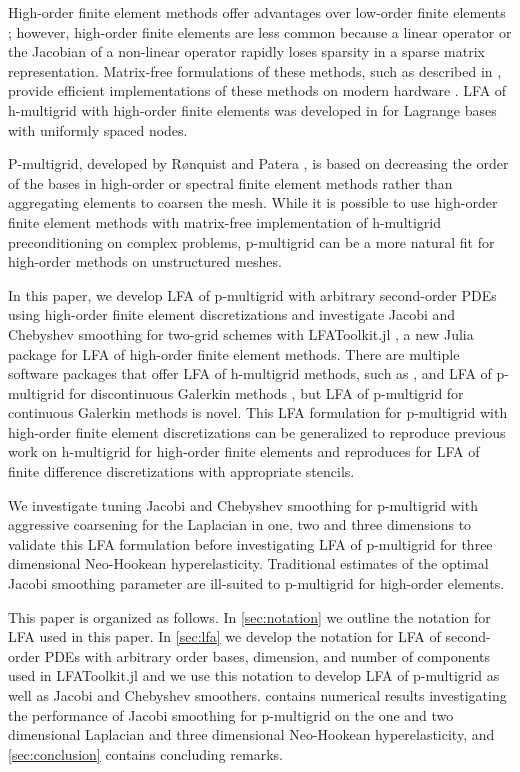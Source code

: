 \documentclass[review]{siamart190516}
\begin{document}
High-order finite element methods offer advantages over low-order finite elements \cite{demkowicz1989toward, oden1989toward, rachowicz1989toward}; however, high-order finite elements are less common because a linear operator or the Jacobian of a non-linear operator rapidly loses sparsity in a sparse matrix representation.
Matrix-free formulations of these methods, such as described in \cite{brown2010efficient, knoll2004jacobian}, provide efficient implementations of these methods on modern hardware \cite{libceed-user-manual, fischer2020scalability}.
LFA of h-multigrid with high-order finite elements was developed in \cite{he2020two} for Lagrange bases with uniformly spaced nodes.

P-multigrid, developed by R{\o}nquist and Patera \cite{ronquist1987spectral}, is based on decreasing the order of the bases in high-order or spectral finite element methods rather than aggregating elements to coarsen the mesh. While it is possible \cite{davydov2019matrix} to use high-order finite element methods with matrix-free implementation of h-multigrid preconditioning on complex problems, p-multigrid can be a more natural fit for high-order methods on unstructured meshes.

In this paper, we develop LFA of p-multigrid with arbitrary second-order PDEs using high-order finite element discretizations and investigate Jacobi and Chebyshev smoothing for two-grid schemes with LFAToolkit.jl \cite{thompson2021toolkit}, a new Julia package for LFA of high-order finite element methods.
There are multiple software packages that offer LFA of h-multigrid methods, such as \cite{kahl2020automated}, and LFA of p-multigrid for discontinuous Galerkin methods \cite{van2011discrete}, but LFA of p-multigrid for continuous Galerkin methods is novel.
This LFA formulation for p-multigrid with high-order finite element discretizations can be generalized to reproduce previous work on h-multigrid for high-order finite elements \cite{he2020two} and reproduces for LFA of finite difference discretizations with appropriate stencils.

We investigate tuning Jacobi and Chebyshev smoothing for p-multigrid with aggressive coarsening for the Laplacian in one, two and three dimensions to validate this LFA formulation before investigating LFA of p-multigrid for three dimensional Neo-Hookean hyperelasticity.
Traditional estimates of the optimal Jacobi smoothing parameter are ill-suited to p-multigrid for high-order elements.

This paper is organized as follows.
In \cref{sec:notation} we outline the notation for LFA used in this paper.
In \cref{sec:lfa} we develop the notation for LFA of second-order PDEs with arbitrary order bases, dimension, and number of components used in LFAToolkit.jl and we use this notation to develop LFA of p-multigrid as well as Jacobi and Chebyshev smoothers.
 contains numerical results investigating the performance of Jacobi smoothing for p-multigrid on the one and two dimensional Laplacian and three dimensional Neo-Hookean hyperelasticity, and \cref{sec:conclusion} contains concluding remarks. 
\end{document}
